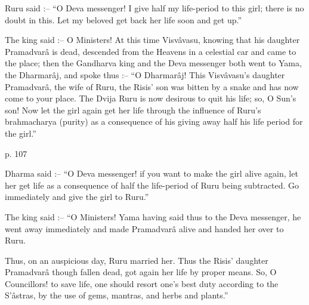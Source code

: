  

Ruru said :-- “O Deva messenger! I give half my life-period to this girl; there is no doubt in this. Let my beloved get back her life soon and get up.”

 

The king said :-- O Ministers! At this time Visvâvasu, knowing that his daughter Pramadvarâ is dead, descended from the Heavens in a celestial car and came to the place; then the Gandharva king and the Deva messenger both went to Yama, the Dharmarâj, and spoke thus :-- “O Dharmarâj! This Visvâvasu's daughter Pramadvarâ, the wife of Ruru, the Risis' son was bitten by a snake and has now come to your place. The Dvija Ruru is now desirous to quit his life; so, O Sun's son! Now let the girl again get her life through the influence of Ruru's brahmacharya (purity) as a consequence of his giving away half his life period for the girl.”

 

p. 107

 

Dharma said :-- “O Deva messenger! if you want to make the girl alive again, let her get life as a consequence of half the life-period of Ruru being subtracted. Go immediately and give the girl to Ruru.”

 

The king said :-- “O Ministers! Yama having said thus to the Deva messenger, he went away immediately and made Pramadvarâ alive and handed her over to Ruru.

 

Thus, on an auspicious day, Ruru married her. Thus the Risis' daughter Pramadvarâ though fallen dead, got again her life by proper means. So, O Councillors! to save life, one should resort one's best duty according to the S’âstras, by the use of gems, mantras, and herbs and plants.”

 

